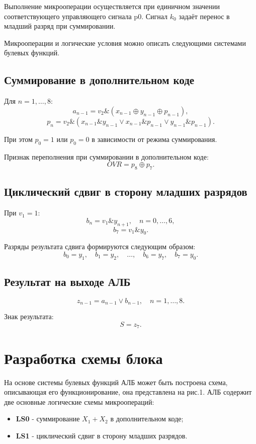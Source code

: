 \documentclass[oneside,a4paper,14pt]{extarticle}
\begin{document}
Выполнение микрооперации осуществляется при единичном значении соответствующего управляющего сигнала p0. Сигнал $k_0$ задаёт перенос в младший разряд при суммировании.

Микрооперации и логические условия можно описать следующими системами булевых функций.

\subsection*{Суммирование в дополнительном коде}

Для $n=1,\dots,8$:
\[
	a_{n-1}=v_2\&(x_{n-1}\oplus y_{n-1}\oplus p_{n-1}),
\]
\[
	p_n=v_2\&(x_{n-1}\&y_{n-1}\vee x_{n-1}\&p_{n-1}\vee y_{n-1}\&p_{n-1}).
\]

При этом $p_0=1$ или $p_0=0$ в зависимости от режима суммирования.

Признак переполнения при суммировании в дополнительном коде:
\[
	OVR=p_8\oplus p_7.
\]
\newpage
\subsection*{Циклический сдвиг в сторону младших разрядов}

При $v_1=1$:
\[
	b_{n}=v_1\&y_{n+1}, \quad n=0,\dots,6,
\]
\[
	b_7=v_1\&y_0.
\]

Разряды результата сдвига формируются следующим образом:
\[
	b_0=y_1,\quad b_1=y_2,\quad \dots,\quad b_6=y_7,\quad b_7=y_0.
\]

\subsection*{Результат на выходе АЛБ}

\[
	z_{n-1}=a_{n-1}\vee b_{n-1}, \quad n=1,\dots,8.
\]

Знак результата:
\[
	S=z_7.
\]

\section*{Разработка схемы блока}

На основе системы булевых функций АЛБ может быть построена схема, описывающая его функционирование, она представлена на рис.1. АЛБ содержит две основные логические схемы микроопераций:

\begin{itemize}
	\item \textbf{LS0} - суммирование $X_1+X_2$ в дополнительном коде;
	\item \textbf{LS1} - циклический сдвиг в сторону младших разрядов.
\end{itemize}
\end{document}
